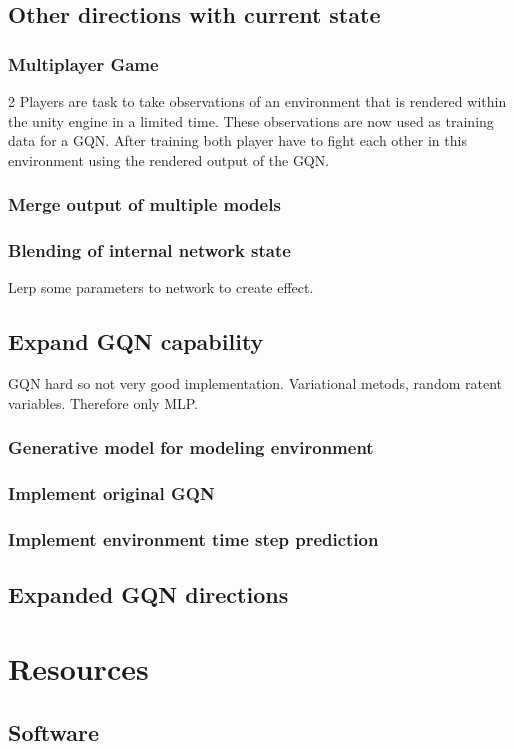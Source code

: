 \documentclass[a4paper, twoside, 10pt]{report}
\begin{document}
\section{Other directions with current state}
\subsection{Multiplayer Game}
2 Players are task to take observations of an environment that is rendered within the unity engine in a limited time. These observations  are now used as training data for a GQN. After training both player have to fight each other in this environment using the rendered output of the GQN.

\subsection{Merge output of multiple models}
\subsection{Blending of internal network state}
Lerp some parameters to network to create effect.

\section{Expand GQN capability}
GQN hard so not very good implementation. Variational metods, random ratent variables. Therefore only MLP.

\subsection{Generative model for modeling environment}
\subsection{Implement original GQN}
\subsection{Implement environment time step prediction}
\section{Expanded GQN directions}
\chapter{Resources}
\section{Software}
\end{document}
